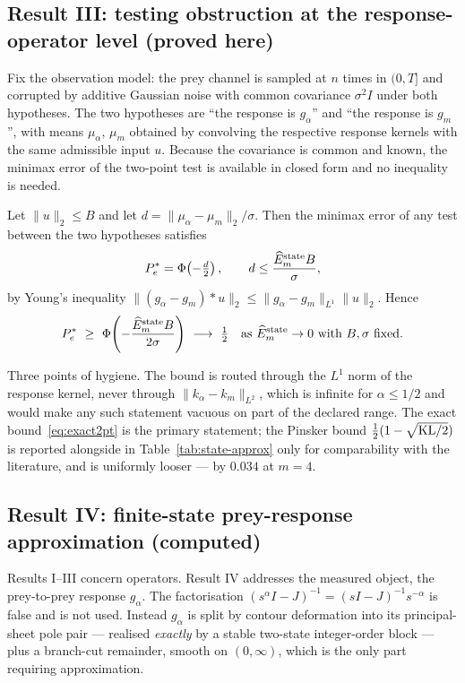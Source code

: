 \subsection{Result III: testing obstruction at the response-operator level (proved here)}
\label{subsec:testing}
Fix the observation model: the prey channel is sampled at $n$ times in $(0,T]$ and corrupted by additive Gaussian noise with common covariance $\sigma^2I$ under both hypotheses. The two hypotheses are ``the response is $g_\alpha$'' and ``the response is $g_m$'', with means $\mu_\alpha$, $\mu_m$ obtained by convolving the respective response kernels with the same admissible input $u$. Because the covariance is common and known, the minimax error of the two-point test is available in closed form and no inequality is needed.

\begin{theorem}
\label{thm:T20}
Let $\|u\|_2\le B$ and let $d=\|\mu_\alpha-\mu_m\|_2/\sigma$. Then the minimax error of any test between the two hypotheses satisfies
\begin{equation}
P_e^*=\Phi\!\left(-\tfrac{d}{2}\right),\qquad
d\le\frac{\widehat E_m^{\rm state}B}{\sigma},
\label{eq:exact2pt}
\end{equation}
by Young's inequality $\|(g_\alpha-g_m)*u\|_2\le\|g_\alpha-g_m\|_{L^1}\|u\|_2$. Hence
\begin{equation}
P_e^*\ \ge\ \Phi\!\left(-\frac{\widehat E_m^{\rm state}B}{2\sigma}\right)\ \longrightarrow\ \tfrac12
\quad\text{as }\widehat E_m^{\rm state}\to0\text{ with }B,\sigma\text{ fixed.}
\label{eq:floor}
\end{equation}
\end{theorem}

Three points of hygiene. The bound is routed through the $L^1$ norm of the response kernel, never through $\|k_\alpha-k_m\|_{L^2}$, which is infinite for $\alpha\le1/2$ and would make any such statement vacuous on part of the declared range. The exact bound~\eqref{eq:exact2pt} is the primary statement; the Pinsker bound $\tfrac12(1-\sqrt{{\rm KL}/2})$ is reported alongside in Table~\ref{tab:state-approx} only for comparability with the literature, and is uniformly looser --- by $0.034$ at $m=4$.

\subsection{Result IV: finite-state prey-response approximation (computed)}
\label{subsec:state}
Results I--III concern operators. Result IV addresses the measured object, the prey-to-prey response $g_\alpha$. The factorisation $(s^\alpha I-J)^{-1}=(sI-J)^{-1}s^{-\alpha}$ is false and is not used. Instead $g_\alpha$ is split by contour deformation into its principal-sheet pole pair --- realised \emph{exactly} by a stable two-state integer-order block --- plus a branch-cut remainder, smooth on $(0,\infty)$, which is the only part requiring approximation.

